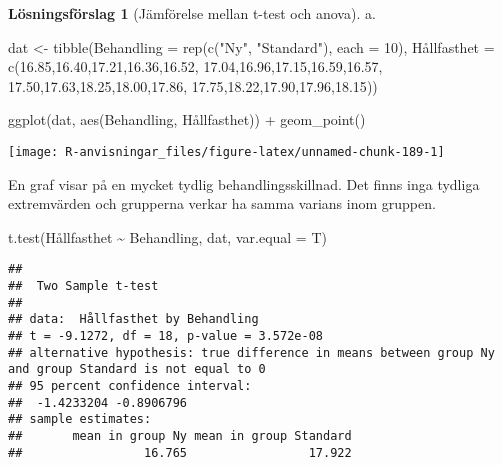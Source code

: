 \documentclass[
]{book}
\newenvironment{Shaded}{\begin{snugshade}}{\end{snugshade}}
\newcommand{\AttributeTok}[1]{\textcolor[rgb]{0.77,0.63,0.00}{#1}}
\newcommand{\DecValTok}[1]{\textcolor[rgb]{0.00,0.00,0.81}{#1}}
\newcommand{\FloatTok}[1]{\textcolor[rgb]{0.00,0.00,0.81}{#1}}
\newcommand{\FunctionTok}[1]{\textcolor[rgb]{0.00,0.00,0.00}{#1}}
\newcommand{\NormalTok}[1]{#1}
\newcommand{\OtherTok}[1]{\textcolor[rgb]{0.56,0.35,0.01}{#1}}
\newcommand{\SpecialCharTok}[1]{\textcolor[rgb]{0.00,0.00,0.00}{#1}}
\newcommand{\StringTok}[1]{\textcolor[rgb]{0.31,0.60,0.02}{#1}}
\theoremstyle{definition}
\theoremstyle{definition}
\theoremstyle{definition}
\theoremstyle{definition}
\newtheorem{hypothesis}{Lösningsförslag}[chapter]
\theoremstyle{remark}
\begin{document}
\begin{hypothesis}[Jämförelse mellan t-test och anova]
a.

\begin{Shaded}
\begin{Highlighting}[]
\NormalTok{dat }\OtherTok{\textless{}{-}} \FunctionTok{tibble}\NormalTok{(}\AttributeTok{Behandling =} \FunctionTok{rep}\NormalTok{(}\FunctionTok{c}\NormalTok{(}\StringTok{"Ny"}\NormalTok{, }\StringTok{"Standard"}\NormalTok{), }\AttributeTok{each =} \DecValTok{10}\NormalTok{),}
\NormalTok{              Hållfasthet }\OtherTok{=} \FunctionTok{c}\NormalTok{(}\FloatTok{16.85}\NormalTok{,}\FloatTok{16.40}\NormalTok{,}\FloatTok{17.21}\NormalTok{,}\FloatTok{16.36}\NormalTok{,}\FloatTok{16.52}\NormalTok{,}
                              \FloatTok{17.04}\NormalTok{,}\FloatTok{16.96}\NormalTok{,}\FloatTok{17.15}\NormalTok{,}\FloatTok{16.59}\NormalTok{,}\FloatTok{16.57}\NormalTok{,}
                              \FloatTok{17.50}\NormalTok{,}\FloatTok{17.63}\NormalTok{,}\FloatTok{18.25}\NormalTok{,}\FloatTok{18.00}\NormalTok{,}\FloatTok{17.86}\NormalTok{,}
                              \FloatTok{17.75}\NormalTok{,}\FloatTok{18.22}\NormalTok{,}\FloatTok{17.90}\NormalTok{,}\FloatTok{17.96}\NormalTok{,}\FloatTok{18.15}\NormalTok{))}

\FunctionTok{ggplot}\NormalTok{(dat, }\FunctionTok{aes}\NormalTok{(Behandling, Hållfasthet)) }\SpecialCharTok{+}
  \FunctionTok{geom\_point}\NormalTok{()}
\end{Highlighting}
\end{Shaded}

\begin{center}\texttt{[image: R-anvisningar\_files/figure-latex/unnamed-chunk-189-1]} \end{center}

En graf visar på en mycket tydlig behandlingsskillnad. Det finns inga tydliga extremvärden och grupperna verkar ha samma varians inom gruppen.

\begin{Shaded}
\begin{Highlighting}[]
\FunctionTok{t.test}\NormalTok{(Hållfasthet }\SpecialCharTok{\textasciitilde{}}\NormalTok{ Behandling, dat, }\AttributeTok{var.equal =}\NormalTok{ T)}
\end{Highlighting}
\end{Shaded}

\begin{verbatim}
## 
##  Two Sample t-test
## 
## data:  Hållfasthet by Behandling
## t = -9.1272, df = 18, p-value = 3.572e-08
## alternative hypothesis: true difference in means between group Ny and group Standard is not equal to 0
## 95 percent confidence interval:
##  -1.4233204 -0.8906796
## sample estimates:
##       mean in group Ny mean in group Standard 
##                 16.765                 17.922
\end{verbatim}


\end{hypothesis}
\end{document}
